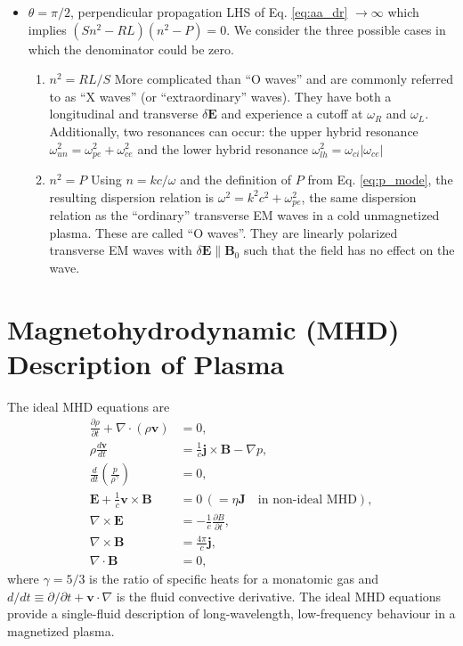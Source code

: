 \begin{itemize}
		\item{$\theta=\pi/2$, perpendicular propagation}
		LHS of Eq. \ref{eq:aa_dr} $\to\infty$ which implies  $(Sn^2 - RL)(n^2 - P)=0$. We consider the three possible cases in which the denominator could be zero.

		\begin{enumerate}

			\item{$n^2=RL/S$}
			More complicated than ``O waves'' and are commonly referred to as ``X waves'' (or ``extraordinary'' waves). They have both a longitudinal and transverse $\delta\mathbf{E}$ and experience a cutoff at $\omega_R$ and $\omega_L$. Additionally, two resonances can occur: the upper hybrid resonance $\omega_{un}^2=\omega_{pe}^2 + \omega_{ce}^2$ and the lower hybrid resonance $\omega_{lh}^2 = \omega_{ci}|\omega_{ce}|$

			\item{$n^2=P$}
			Using $n=kc/\omega$ and the definition of $P$ from Eq. \ref{eq:p_mode}, the resulting dispersion relation is $\omega^2=k^2c^2 + \omega_{pe}^2$, the same dispersion relation as the ``ordinary'' transverse EM waves in a cold unmagnetized plasma. These are called ``O waves''. They are linearly polarized transverse EM waves with $\delta\mathbf{E}\parallel\mathbf{B}_0$ such that the field has no effect on the wave. 
		\end{enumerate}
	\end{itemize}

\section{Magnetohydrodynamic (MHD) Description of Plasma}

The ideal MHD equations are
\begin{align}
	\frac{\partial\rho}{\partial t} + \nabla\cdot(\rho\mathbf{v}) &= 0,\label{eq:mhd_mass}\\
	\rho\frac{d\mathbf{v}}{dt} &= \frac{1}{c}\mathbf{j}\times\mathbf{B} - \nabla p,\label{eq:mhd_mmtm}\\
	\frac{d}{dt}\left(\frac{p}{\rho^{\gamma}}\right)&=0,\label{eq:mhd_energy}\\
	\mathbf{E} + \frac{1}{c}\mathbf{v}\times\mathbf{B} &= 0\,(=\eta\mathbf{J}\quad\text{in non-ideal MHD}),\label{eq:mhd_ohm}\\
	\nabla\times\mathbf{E} &= -\frac{1}{c}\frac{\partial B}{\partial t},\\
	\nabla\times\mathbf{B} &= \frac{4\pi}{c}\mathbf{j},\label{eq:low_freq_ampere}\\
	\nabla\cdot\mathbf{B} &= 0,
\end{align}
where $\gamma=5/3$ is the ratio of specific heats for a monatomic gas and $d/dt\equiv \partial/\partial t + \mathbf{v}\cdot\nabla$ is the fluid convective derivative. The ideal MHD equations provide a single-fluid description of long-wavelength, low-frequency behaviour in a magnetized plasma.

